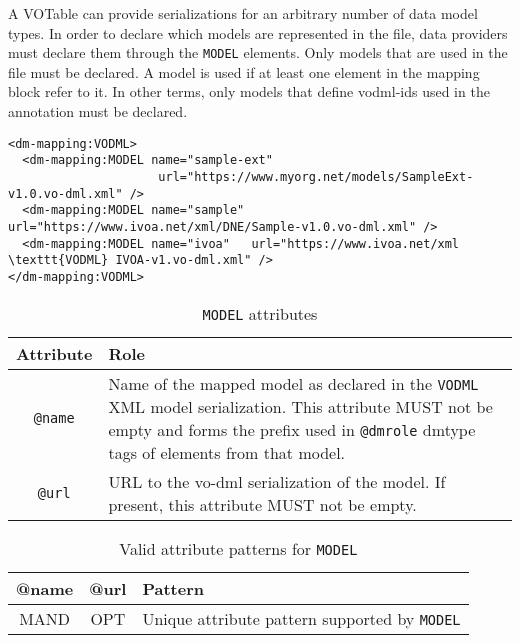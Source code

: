 A VOTable can provide serializations for an arbitrary number of data model
types. In order to declare which models are represented in the file, data
providers must declare them through the \texttt{MODEL} elements.
Only models that are used in the file must be declared. A model is
used if at least one element in the mapping block refer to it. In other terms, only models that define vodml-ids used in the
annotation must be declared.

\begin{lstlisting}[frame=single,caption={Example \texttt{MODEL} mapping block},style=XML,basicstyle=\tiny]
<dm-mapping:VODML>
  <dm-mapping:MODEL name="sample-ext"
                     url="https://www.myorg.net/models/SampleExt-v1.0.vo-dml.xml" />
  <dm-mapping:MODEL name="sample" url="https://www.ivoa.net/xml/DNE/Sample-v1.0.vo-dml.xml" />
  <dm-mapping:MODEL name="ivoa"   url="https://www.ivoa.net/xml \texttt{VODML} IVOA-v1.vo-dml.xml" />
</dm-mapping:VODML>
\end{lstlisting}

\begin{table}[!htbp]
  \small
  \centering
  \begin{tabulary}{\linewidth}{|c|J|}       
    \hline 
         \textbf{Attribute} & 
         \textbf {Role}\\
    \hline
    \hline  
         \texttt{@name}  & 
         Name of the mapped model as declared in the \texttt{VODML} XML model serialization.  This attribute MUST not be empty and forms the prefix used in  \texttt{@dmrole} dmtype tags of elements from that model.  \\
    \hline 
         \texttt{@url} & 
         URL to the vo-dml serialization of the model. If present, this attribute MUST not be empty.\\
    \hline 
  \end{tabulary}
  \caption{\texttt{MODEL} attributes} 
  \label{tbl:model-att}
\end{table}


\begin{table}[!htbp]
  \small
  \centering
  \begin{tabulary}{\linewidth}{|c |c |J|}
    \hline 
        \textbf{@name} &
        \textbf{@url} &
        \textbf{Pattern}\\
    \hline      \hline  
        MAND &           
        OPT &           
        Unique attribute pattern supported by \texttt{MODEL}\\
    \hline 
  \end{tabulary}
  \caption{Valid attribute patterns for  \texttt{MODEL}} 
  \label{tbl:model-pattern}
\end{table}
